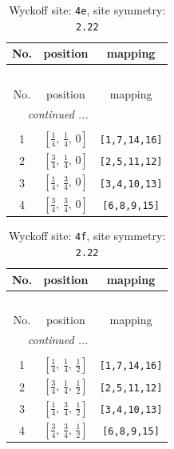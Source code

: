 \documentclass[fleqn,8pt]{jsarticle}
\begin{document}
\begin{longtable}{ccc}
\caption{Wyckoff site: {\tt 4e}, site symmetry: {\tt 2.22}}
 \\
 \hline \hline
No. & position & mapping \\ \hline \endfirsthead

\multicolumn{2}{l}{\tablename\ \thetable{}} \\
 \hline \hline
No. & position & mapping \\ \hline \endhead

 \hline \hline
\multicolumn{2}{r}{\footnotesize\it continued ...} \\ \endfoot

 \hline \hline
\multicolumn{2}{r}{} \\ \endlastfoot

1 & $\left[ \frac{1}{4},\, \frac{1}{4},\, 0 \right]$ & {\tt [1,7,14,16]} \\ \hline
2 & $\left[ \frac{3}{4},\, \frac{1}{4},\, 0 \right]$ & {\tt [2,5,11,12]} \\ \hline
3 & $\left[ \frac{1}{4},\, \frac{3}{4},\, 0 \right]$ & {\tt [3,4,10,13]} \\ \hline
4 & $\left[ \frac{3}{4},\, \frac{3}{4},\, 0 \right]$ & {\tt [6,8,9,15]} \\
\end{longtable}
\renewcommand{\arraystretch}{1.2}
\begin{longtable}{ccc}
\caption{Wyckoff site: {\tt 4f}, site symmetry: {\tt 2.22}}
 \\
 \hline \hline
No. & position & mapping \\ \hline \endfirsthead

\multicolumn{2}{l}{\tablename\ \thetable{}} \\
 \hline \hline
No. & position & mapping \\ \hline \endhead

 \hline \hline
\multicolumn{2}{r}{\footnotesize\it continued ...} \\ \endfoot

 \hline \hline
\multicolumn{2}{r}{} \\ \endlastfoot

1 & $\left[ \frac{1}{4},\, \frac{1}{4},\, \frac{1}{2} \right]$ & {\tt [1,7,14,16]} \\ \hline
2 & $\left[ \frac{3}{4},\, \frac{1}{4},\, \frac{1}{2} \right]$ & {\tt [2,5,11,12]} \\ \hline
3 & $\left[ \frac{1}{4},\, \frac{3}{4},\, \frac{1}{2} \right]$ & {\tt [3,4,10,13]} \\ \hline
4 & $\left[ \frac{3}{4},\, \frac{3}{4},\, \frac{1}{2} \right]$ & {\tt [6,8,9,15]} \\
\end{longtable}
\end{document}
